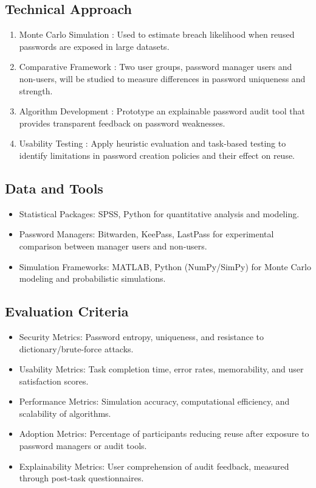 \documentclass[a4paper, 12pt]{article}
\begin{document}
\subsection{Technical Approach}

\begin{enumerate}
    \item Monte Carlo Simulation : Used to estimate breach likelihood when reused passwords are exposed in large datasets.

    \item Comparative Framework : Two user groups, password manager users and non-users, will be studied to measure differences in password uniqueness and strength.

    \item Algorithm Development : Prototype an explainable password audit tool that provides transparent feedback on password weaknesses.

    \item Usability Testing : Apply heuristic evaluation and task-based testing to identify limitations in password creation policies and their effect on reuse.

\end{enumerate}

\subsection{Data and Tools}
\begin{itemize}
    \item Statistical Packages: SPSS, Python for quantitative analysis and modeling.
    \item Password Managers: Bitwarden, KeePass, LastPass for experimental comparison between manager users and non-users.
    \item Simulation Frameworks: MATLAB, Python (NumPy/SimPy) for Monte Carlo modeling and probabilistic simulations.
    
\end{itemize}


\subsection{Evaluation Criteria}

\begin{itemize}
    \item Security Metrics: Password entropy, uniqueness, and resistance to dictionary/brute-force attacks.
    \item Usability Metrics: Task completion time, error rates, memorability, and user satisfaction scores.
    \item Performance Metrics: Simulation accuracy, computational efficiency, and scalability of algorithms.
    \item Adoption Metrics: Percentage of participants reducing reuse after exposure to password managers or audit tools.
    \item Explainability Metrics: User comprehension of audit feedback, measured through post-task questionnaires.
\end{itemize}
\end{document}
